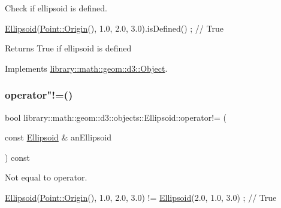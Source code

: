 Check if ellipsoid is defined. 


\begin{DoxyCode}
\hyperlink{classlibrary_1_1math_1_1geom_1_1d3_1_1objects_1_1_ellipsoid_aae81fe0edc7f0e8d4590ea89ae73cb14}{Ellipsoid}(\hyperlink{classlibrary_1_1math_1_1geom_1_1d3_1_1objects_1_1_point_ab2a38e285c562e50bf350272c083986f}{Point::Origin}(), 1.0, 2.0, 3.0).isDefined() ; \textcolor{comment}{// True}
\end{DoxyCode}


\begin{DoxyReturn}{Returns}
True if ellipsoid is defined 
\end{DoxyReturn}


Implements \hyperlink{classlibrary_1_1math_1_1geom_1_1d3_1_1_object_a2216442e322f0c3ca5f01a4efa22baf7}{library\+::math\+::geom\+::d3\+::\+Object}.

\mbox{\label{classlibrary_1_1math_1_1geom_1_1d3_1_1objects_1_1_ellipsoid_af6e0b91e6de57a4fa4c027442613d91b}} 
\subsubsection{\texorpdfstring{operator"!=()}{operator!=()}}
{\footnotesize\ttfamily bool library\+::math\+::geom\+::d3\+::objects\+::\+Ellipsoid\+::operator!= (\begin{DoxyParamCaption}\item[{const \hyperlink{classlibrary_1_1math_1_1geom_1_1d3_1_1objects_1_1_ellipsoid}{Ellipsoid} \&}]{an\+Ellipsoid }\end{DoxyParamCaption}) const}



Not equal to operator. 


\begin{DoxyCode}
\hyperlink{classlibrary_1_1math_1_1geom_1_1d3_1_1objects_1_1_ellipsoid_aae81fe0edc7f0e8d4590ea89ae73cb14}{Ellipsoid}(\hyperlink{classlibrary_1_1math_1_1geom_1_1d3_1_1objects_1_1_point_ab2a38e285c562e50bf350272c083986f}{Point::Origin}(), 1.0, 2.0, 3.0) != \hyperlink{classlibrary_1_1math_1_1geom_1_1d3_1_1objects_1_1_ellipsoid_aae81fe0edc7f0e8d4590ea89ae73cb14}{Ellipsoid}(2.0, 1.0, 3.0) ; \textcolor{comment}{//
       True}
\end{DoxyCode}



